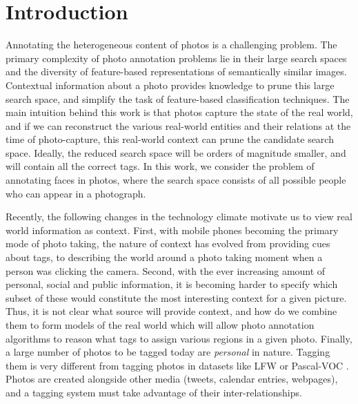 \chapter{Introduction}

Annotating the heterogeneous content of photos is a challenging problem. The primary complexity of photo annotation problems lie in their large search spaces and the diversity of feature-based representations of semantically similar images. Contextual information about a photo provides knowledge to prune this large search space, and simplify the task of feature-based classification techniques. The main intuition behind this work is that photos capture the state of the real world, and if we can reconstruct the various real-world entities and their relations at the time of photo-capture, this real-world context can prune the candidate search space. Ideally, the reduced search space will be orders of magnitude smaller, and will contain all the correct tags. In this work, we consider the problem of annotating faces in photos, where the search space consists of all possible people who can appear in a photograph.

Recently, the following changes in the technology climate motivate us to view real world information as context. First, with mobile phones becoming the primary mode of photo taking, the nature of context has evolved from providing cues about tags, to describing the world around a photo taking moment when a person was clicking the camera. Second, with the ever increasing amount of personal, social and public information, it is becoming harder to specify which subset of these would constitute the most interesting context for a given picture. Thus, it is not clear what source will provide context, and how do we combine them to form models of the real world which will allow photo annotation algorithms to reason what tags to assign various regions in a given photo. Finally, a large number of photos to be tagged today are \textit{personal} in nature. Tagging them is very different from tagging photos in datasets like LFW \cite{huang2008labeled} or Pascal-VOC \cite{everingham2010pascal}. Photos are created alongside other media (tweets, calendar entries, webpages), and a tagging system must take advantage of their inter-relationships.


